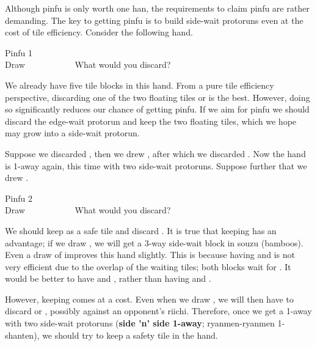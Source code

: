 Although {\jap pinfu} is only worth one {\jap han}, the requirements to claim {\jap pinfu} are rather demanding. The key to getting {\jap pinfu} is to build side-wait protoruns even at the cost of tile efficiency. Consider the following hand.
\begin{itembox}[r]{{\jap Pinfu} 1}
\bp
{}~\\
\hfill\footnotesize{Draw~~~~~~~~~~~}
\ep
\vspace{-17pt}What would you discard? \vspace{-5pt}
\end{itembox}
\noindent
We already have five tile blocks in this hand. From a pure tile efficiency perspective, discarding one of the two floating tiles {\LARGE{}} or {\LARGE{}} is the best. However, doing so significantly reduces our chance of getting {\jap pinfu}. If we aim for {\jap pinfu} we should discard the edge-wait protorun {\LARGE{}} and keep the two floating tiles, which we hope may grow into a side-wait protorun.

\bigskip
Suppose we discarded {\LARGE{}}, then we drew {\LARGE{}}, after which we discarded {\LARGE{}}. Now the hand is 1-away again, this time with two side-wait protoruns. Suppose further that we drew {\LARGE\xi}.
\begin{itembox}[r]{{\jap Pinfu} 2}
\bp
{}~\xi\\
\hfill\footnotesize{Draw~~~~~~~~~~~}
\ep
\vspace{-17pt}What would you discard? \vspace{-5pt}
\end{itembox}
\noindent
We should keep {\LARGE\xi} as a safe tile and discard {\LARGE{}}. It is true that keeping {\LARGE{}} has an advantage; if we draw {\LARGE{}}, we will get a 3-way side-wait block in {\jap souzu} (bamboos). Even a draw of {\LARGE{}} improves this hand slightly. This is because having {\LARGE{}} and {\LARGE{}} is not very efficient due to the overlap of the waiting tiles; both blocks wait for {\LARGE{}}. It would be better to have {\LARGE{}} and {\LARGE{}}, rather than having {\LARGE{}} and {\LARGE{}}.

\bigskip
However, keeping {\LARGE{}} comes at a cost. Even when we draw {\LARGE{}}, we will then have to discard {\LARGE{}} or {\LARGE{}}, possibly against an opponent's riichi.
Therefore, once we get a 1-away with two side-wait protoruns ({\bf side 'n' side 1-away}; {\jap ryanmen-ryanmen 1-shanten}), we should try to keep a safety tile in the hand.

